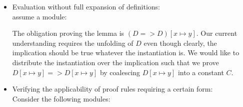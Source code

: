 \documentclass[a4paper]{article}
\theoremstyle{definition}
\begin{document}
\begin{itemize}
\item Evaluation without full expansion of definitions:\\
  assume a module:
\begin{parcolumns}{2}

\end{parcolumns}
The obligation proving the lemma is $(D => D)[x \mapsto y]$. Our current
 understanding requires the unfolding of $D$ even though clearly,
 the implication should be true whatever the instantiation is. We would
 like to distribute the instantiation over the implication such that we
 prove $D[x \mapsto y] => D[x \mapsto y]$ by coalescing $D[x \mapsto y]$
 into a constant $C$.
\item Verifying the applicability of proof rules requiring a certain form:\\
  Consider the following modules:
\begin{parcolumns}{2}


\end{parcolumns}


\end{itemize}
\end{document}
